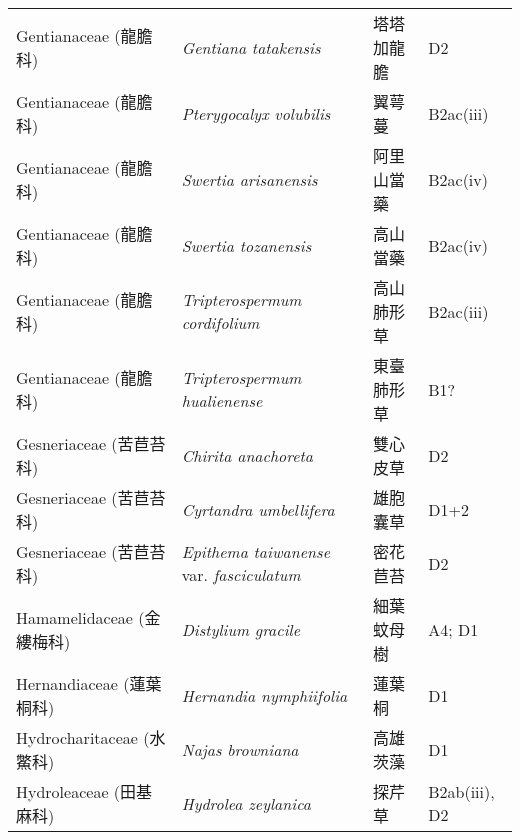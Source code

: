\begin{longtable}{p{3cm}p{5cm}p{3cm}p{4cm}}
    Gentianaceae (龍膽科) & \textit{Gentiana tatakensis}  & 塔塔加龍膽 & D2 \index{Gentiana@\textit{Gentiana}!tatakensis@\textit{tatakensis}}  \index{塔塔加龍膽} \\
    Gentianaceae (龍膽科) & \textit{Pterygocalyx volubilis}  & 翼萼蔓 & B2ac(iii) \index{Pterygocalyx@\textit{Pterygocalyx}!volubilis@\textit{volubilis}}  \index{翼萼蔓} \\
    Gentianaceae (龍膽科) & \textit{Swertia arisanensis}  & 阿里山當藥 & B2ac(iv) \index{Swertia@\textit{Swertia}!arisanensis@\textit{arisanensis}}  \index{阿里山當藥} \\
    Gentianaceae (龍膽科) & \textit{Swertia tozanensis}  & 高山當藥 & B2ac(iv) \index{Swertia@\textit{Swertia}!tozanensis@\textit{tozanensis}}  \index{高山當藥} \\
    Gentianaceae (龍膽科) & \textit{Tripterospermum cordifolium}  & 高山肺形草 & B2ac(iii) \index{Tripterospermum@\textit{Tripterospermum}!cordifolium@\textit{cordifolium}}  \index{高山肺形草} \\
    Gentianaceae (龍膽科) & \textit{Tripterospermum hualienense}  & 東臺肺形草 & B1? \index{Tripterospermum@\textit{Tripterospermum}!hualienense@\textit{hualienense}}  \index{東臺肺形草} \\
    Gesneriaceae (苦苣苔科) & \textit{Chirita anachoreta}  & 雙心皮草 & D2 \index{Chirita@\textit{Chirita}!anachoreta@\textit{anachoreta}}  \index{雙心皮草} \\
    Gesneriaceae (苦苣苔科) & \textit{Cyrtandra umbellifera}  & 雄胞囊草 & D1+2 \index{Cyrtandra@\textit{Cyrtandra}!umbellifera@\textit{umbellifera}}  \index{雄胞囊草} \\
    Gesneriaceae (苦苣苔科) & \textit{Epithema taiwanense} var. \textit{fasciculatum}  & 密花苣苔 & D2 \index{Epithema@\textit{Epithema}!taiwanense@\textit{taiwanense}!var. fasciculatum@var. \textit{fasciculatum}}  \index{密花苣苔} \\
    Hamamelidaceae (金縷梅科) & \textit{Distylium gracile}  & 細葉蚊母樹 & A4; D1 \index{Distylium@\textit{Distylium}!gracile@\textit{gracile}}  \index{細葉蚊母樹} \\
    Hernandiaceae (蓮葉桐科) & \textit{Hernandia nymphiifolia}  & 蓮葉桐 & D1 \index{Hernandia@\textit{Hernandia}!nymphiifolia@\textit{nymphiifolia}}  \index{蓮葉桐} \\
    Hydrocharitaceae (水鱉科) & \textit{Najas browniana}  & 高雄茨藻 & D1 \index{Najas@\textit{Najas}!browniana@\textit{browniana}}  \index{高雄茨藻} \\
    Hydroleaceae (田基麻科) & \textit{Hydrolea zeylanica}  & 探芹草 & B2ab(iii), D2 \index{Hydrolea@\textit{Hydrolea}!zeylanica@\textit{zeylanica}}  \index{探芹草} \\

\end{longtable}
